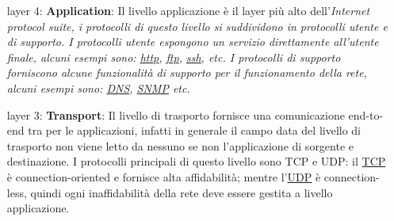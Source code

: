 \begin{enumerate} %
    \item[layer 4:] \textbf{Application}: Il livello applicazione è il layer pi\`u alto dell'\it{Internet protocol suite}, i protocolli di questo livello si suddividono in protocolli utente e di supporto. \newline
    I protocolli utente espongono un servizio direttamente all'utente finale, alcuni esempi sono: \href{https://en.wikipedia.org/wiki/Hypertext_Transfer_Protocol}{http}, \href{https://en.wikipedia.org/wiki/File_Transfer_Protocol}{ftp}, \href{https://en.wikipedia.org/wiki/Secure_Shell}{ssh}, etc. \newline 
    I protocolli di supporto forniscono alcune funzionalità di supporto per il funzionamento della rete, alcuni esempi sono: \href{https://en.wikipedia.org/wiki/Domain_Name_System}{DNS}, \href{https://en.wikipedia.org/wiki/Simple_Network_Management_Protocol}{SNMP} etc.



    \item[layer 3:] \textbf{Transport}: Il livello di trasporto fornisce una comunicazione end-to-end tra per le applicazioni, infatti in generale il campo data del livello di trasporto non viene letto da nessuno se non l'applicazione di sorgente e destinazione. I protocolli principali di questo livello sono TCP e UDP: il \href{https://en.wikipedia.org/wiki/Transmission_Control_Protocol}{TCP} è connection-oriented e fornisce alta affidabilità; mentre l'\href{https://en.wikipedia.org/wiki/User_Datagram_Protocol}{UDP} è connection-less, quindi ogni inaffidabilità della rete deve essere gestita a livello applicazione.
    

\end{enumerate}
